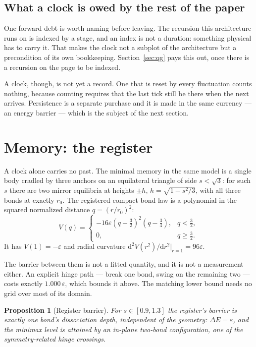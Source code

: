 \documentclass[11pt,a4paper]{article}
\newcommand{\dd}{\mathrm{d}}
\theoremstyle{definition}
\theoremstyle{plain}
\newtheorem{proposition}{Proposition}
\theoremstyle{remark}
\begin{document}
\subsection{What a clock is owed by the rest of the paper}

One forward debt is worth naming before leaving. The recursion this
architecture runs on is indexed by a stage, and an index is not a
duration: something physical has to carry it. That makes the clock not a
subplot of the architecture but a precondition of its own bookkeeping.
Section~\ref{sec:qg} pays this out, once there is a recursion on the page
to be indexed.

A clock, though, is not yet a record. One that is reset by every
fluctuation counts nothing, because counting requires that the last tick
still be there when the next arrives. Persistence is a separate purchase
and it is made in the same currency --- an energy barrier --- which is the
subject of the next section.


\section{Memory: the register}
\label{sec:register}

A clock alone carries no past. The minimal memory in the same model is a
single body cradled by three anchors on an equilateral triangle of side
$s<\sqrt3$: for such $s$ there are two mirror equilibria at heights
$\pm h$, $h = \sqrt{1-s^2/3}$, with all three bonds at exactly $r_0$.
The registered compact bond law is a polynomial in the squared normalized
distance $q=(r/r_0)^2$:
\begin{equation}
V(q) =
\begin{cases}
-16\varepsilon(q-\tfrac32)^2(q-\tfrac34), & q<\tfrac32,\\
0, & q\ge\tfrac32.
\end{cases}
\label{eq:registerbond}
\end{equation}
It has $V(1)=-\varepsilon$ and radial curvature
$\dd^2V(r^2)/\dd r^2|_{r=1}=96\varepsilon$.

The barrier between them is not a fitted quantity, and it is not a
measurement either. An explicit hinge path --- break one bond, swing on
the remaining two --- costs exactly $1.000\,\varepsilon$, which bounds it
above. The matching lower bound needs no grid over most of its domain.

\begin{proposition}[Register barrier]
\label{prop:registerbarrier}
For $s\in[0.9,1.3]$ the register's barrier is exactly one bond's
dissociation depth, independent of the geometry: $\Delta E = \varepsilon$,
and the minimax level is attained by an in-plane two-bond configuration,
one of the symmetry-related hinge crossings.
\end{proposition}
\end{document}
